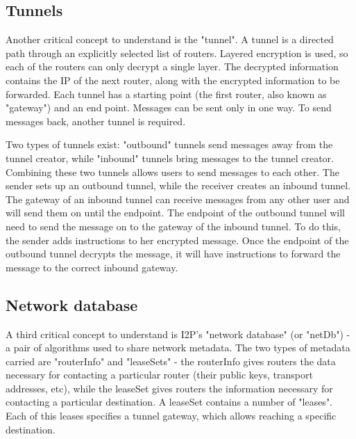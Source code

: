 \documentclass[a4paper,twocolumn,12pt]{article}
\begin{document}
\subsection{Tunnels}

Another critical concept to understand is the "tunnel". A tunnel is a directed path through an explicitly selected list of routers. Layered encryption is used, so each of the routers can only decrypt a single layer. The decrypted information contains the IP of the next router, along with the encrypted information to be forwarded. Each tunnel has a starting point (the first router, also known as "gateway") and an end point. Messages can be sent only in one way. To send messages back, another tunnel is required.

Two types of tunnels exist: "outbound" tunnels send messages away from the tunnel creator, while "inbound" tunnels bring messages to the tunnel creator. Combining these two tunnels allows users to send messages to each other. The sender sets up an outbound tunnel, while the receiver creates an inbound tunnel. The gateway of an inbound tunnel can receive messages from any other user and will send them on until the endpoint. The endpoint of the outbound tunnel will need to send the message on to the gateway of the inbound tunnel. To do this, the sender adds instructions to her encrypted message. Once the endpoint of the outbound tunnel decrypts the message, it will have instructions to forward the message to the correct inbound gateway.

\subsection{Network database}

A third critical concept to understand is I2P's "network database" (or "netDb") - a pair of algorithms used to share network metadata. The two types of metadata carried are "routerInfo" and "leaseSets" - the routerInfo gives routers the data necessary for contacting a particular router (their public keys, transport addresses, etc), while the leaseSet gives routers the information necessary for contacting a particular destination. A leaseSet contains a number of "leases". Each of this leases specifies a tunnel gateway, which allows reaching a specific destination.




\end{document}

